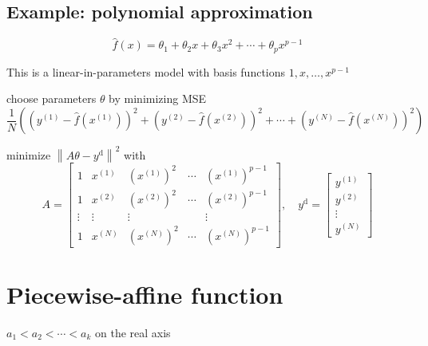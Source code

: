 \subsection{Example: polynomial approximation}

\begin{problem}
    $$
\hat{f}(x)=\theta_{1}+\theta_{2} x+\theta_{3} x^{2}+\cdots+\theta_{p} x^{p-1}
$$
\end{problem}

This is a linear-in-parameters model with basis functions $ 1, x, \ldots, x^{p-1} $

\begin{problem}
    choose parameters $ \theta $ by minimizing MSE
$$
\frac{1}{N}\left(\left(y^{(1)}-\hat{f}\left(x^{(1)}\right)\right)^{2}+\left(y^{(2)}-\hat{f}\left(x^{(2)}\right)\right)^{2}+\cdots+\left(y^{(N)}-\hat{f}\left(x^{(N)}\right)\right)^{2}\right)
$$
\end{problem}

\begin{problem} 
    minimize $ \left\|A \theta-y^{\mathrm{d}}\right\|^{2} $ with
    $$
    A=\left[\begin{array}{ccccc}
    1 & x^{(1)} & \left(x^{(1)}\right)^{2} & \cdots & \left(x^{(1)}\right)^{p-1} \\
    1 & x^{(2)} & \left(x^{(2)}\right)^{2} & \cdots & \left(x^{(2)}\right)^{p-1} \\
    \vdots & \vdots & \vdots & & \vdots \\
    1 & x^{(N)} & \left(x^{(N)}\right)^{2} & \cdots & \left(x^{(N)}\right)^{p-1}
    \end{array}\right], \quad y^{\mathrm{d}}=\left[\begin{array}{c}
    y^{(1)} \\
    y^{(2)} \\
    \vdots \\
    y^{(N)}
    \end{array}\right]
    $$
\end{problem}


\section{Piecewise-affine function}

\begin{definition}
    $ a_{1}<a_{2}<\cdots<a_{k} $ on the real axis
\end{definition}

